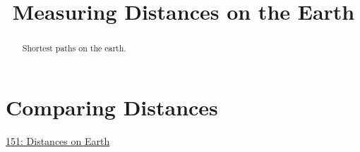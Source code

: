 \documentclass{ximera}
\title{Measuring Distances on the Earth}
\begin{document}
\begin{abstract}
Shortest paths on the earth.
\end{abstract}
\maketitle


\section{Comparing Distances}

\begin{question} \label{Q34dgbnhhtrg}

\begin{onlineOnly}
   \begin{center}
\end{center}
\end{onlineOnly}

\href{https://www.desmos.com/3d/ajoeay29il}{151: Distances on Earth}

\end{question}
\end{document}
